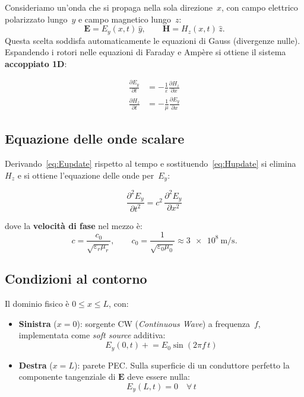 \documentclass[a4paper, 11pt]{article}
\newcommand{\eps}{\varepsilon}
\newcommand{\muu}{\mu}
\newcommand{\Efield}{E_y}
\newcommand{\Hfield}{H_z}
\begin{document}
Consideriamo un'onda che si propaga nella sola direzione~$x$, con campo elettrico
polarizzato lungo~$y$ e campo magnetico lungo~$z$:
\[
    \bm{E} = \Efield(x,t)\,\hat{y}, \qquad
    \bm{H} = \Hfield(x,t)\,\hat{z}.
\]
Questa scelta soddisfa automaticamente le equazioni di Gauss (divergenze nulle).
Espandendo i rotori nelle equazioni di Faraday e Ampère si ottiene il sistema
\textbf{accoppiato 1D}:

\begin{tcolorbox}[colback=gray!8, colframe=gray!50, title=Sistema accoppiato $E_y$--$H_z$ in 1D]
\begin{align}
    \frac{\partial \Efield}{\partial t} &= -\frac{1}{\eps}\frac{\partial \Hfield}{\partial x}
    \label{eq:Eupdate}\\[6pt]
    \frac{\partial \Hfield}{\partial t} &= -\frac{1}{\muu}\frac{\partial \Efield}{\partial x}
    \label{eq:Hupdate}
\end{align}
\end{tcolorbox}

\subsection{Equazione delle onde scalare}

Derivando~\eqref{eq:Eupdate} rispetto al tempo e sostituendo~\eqref{eq:Hupdate}
si elimina~$H_z$ e si ottiene l'equazione delle onde per~$E_y$:

\begin{equation}
    \boxed{\frac{\partial^2 \Efield}{\partial t^2} = c^2\,\frac{\partial^2 \Efield}{\partial x^2}}
    \label{eq:wave}
\end{equation}

dove la \textbf{velocità di fase} nel mezzo è:
\begin{equation}
    c = \frac{c_0}{\sqrt{\eps_r \muu_r}}, \qquad c_0 = \frac{1}{\sqrt{\eps_0\muu_0}} \approx \SI{3e8}{\metre\per\second}.
    \label{eq:phase_vel}
\end{equation}

\subsection{Condizioni al contorno}

Il dominio fisico è $0 \le x \le L$, con:

\begin{itemize}
    \item \textbf{Sinistra} ($x=0$): sorgente CW (\emph{Continuous Wave}) a
          frequenza~$f$, implementata come \emph{soft source} additiva:
          \[
              \Efield(0,t) \mathrel{+}= E_0 \sin(2\pi f\, t)
          \]
    \item \textbf{Destra} ($x=L$): parete PEC. Sulla superficie di un conduttore
          perfetto la componente tangenziale di $\bm{E}$ deve essere nulla:
          \[
              \Efield(L,t) = 0 \quad \forall\, t
          \]
\end{itemize}
\end{document}
